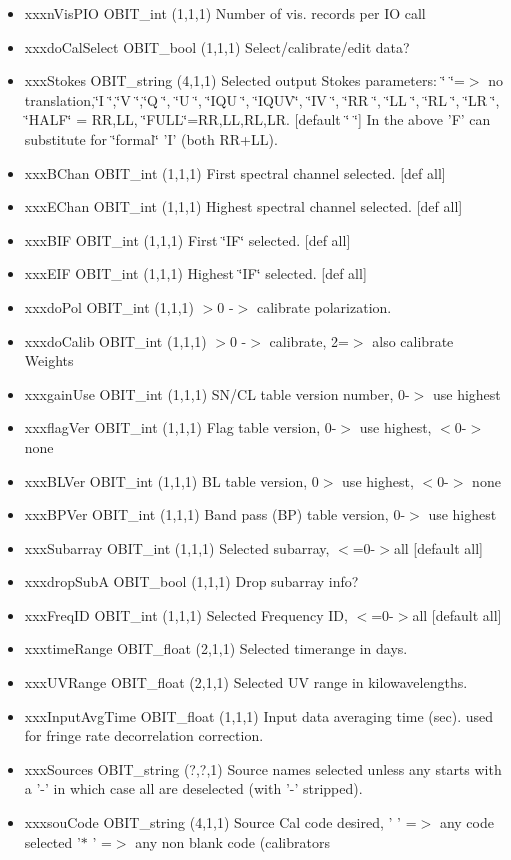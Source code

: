 \begin{Desc}
\begin{description}
\begin{itemize}
\item xxxn\-Vis\-PIO OBIT\_\-int (1,1,1) Number of vis. records per IO call \item xxxdo\-Cal\-Select OBIT\_\-bool (1,1,1) Select/calibrate/edit data? \item xxx\-Stokes OBIT\_\-string (4,1,1) Selected output Stokes parameters: \char`\"{}    \char`\"{}=$>$ no translation,\char`\"{}I   \char`\"{},\char`\"{}V   \char`\"{},\char`\"{}Q   \char`\"{}, \char`\"{}U   \char`\"{}, \char`\"{}IQU \char`\"{}, \char`\"{}IQUV\char`\"{}, \char`\"{}IV  \char`\"{}, \char`\"{}RR  \char`\"{}, \char`\"{}LL  \char`\"{}, \char`\"{}RL  \char`\"{}, \char`\"{}LR  \char`\"{}, \char`\"{}HALF\char`\"{} = RR,LL, \char`\"{}FULL\char`\"{}=RR,LL,RL,LR. [default \char`\"{}    \char`\"{}] In the above 'F' can substitute for \char`\"{}formal\char`\"{} 'I' (both RR+LL). \item xxx\-BChan OBIT\_\-int (1,1,1) First spectral channel selected. [def all] \item xxx\-EChan OBIT\_\-int (1,1,1) Highest spectral channel selected. [def all] \item xxx\-BIF OBIT\_\-int (1,1,1) First \char`\"{}IF\char`\"{} selected. [def all] \item xxx\-EIF OBIT\_\-int (1,1,1) Highest \char`\"{}IF\char`\"{} selected. [def all] \item xxxdo\-Pol OBIT\_\-int (1,1,1) $>$0 -$>$ calibrate polarization. \item xxxdo\-Calib OBIT\_\-int (1,1,1) $>$0 -$>$ calibrate, 2=$>$ also calibrate Weights \item xxxgain\-Use OBIT\_\-int (1,1,1) SN/CL table version number, 0-$>$ use highest \item xxxflag\-Ver OBIT\_\-int (1,1,1) Flag table version, 0-$>$ use highest, $<$0-$>$ none \item xxx\-BLVer OBIT\_\-int (1,1,1) BL table version, 0$>$ use highest, $<$0-$>$ none \item xxx\-BPVer OBIT\_\-int (1,1,1) Band pass (BP) table version, 0-$>$ use highest \item xxx\-Subarray OBIT\_\-int (1,1,1) Selected subarray, $<$=0-$>$all [default all] \item xxxdrop\-Sub\-A OBIT\_\-bool (1,1,1) Drop subarray info? \item xxx\-Freq\-ID OBIT\_\-int (1,1,1) Selected Frequency ID, $<$=0-$>$all [default all] \item xxxtime\-Range OBIT\_\-float (2,1,1) Selected timerange in days. \item xxx\-UVRange OBIT\_\-float (2,1,1) Selected UV range in kilowavelengths. \item xxx\-Input\-Avg\-Time OBIT\_\-float (1,1,1) Input data averaging time (sec). used for fringe rate decorrelation correction. \item xxx\-Sources OBIT\_\-string (?,?,1) Source names selected unless any starts with a '-' in which case all are deselected (with '-' stripped). \item xxxsou\-Code OBIT\_\-string (4,1,1) Source Cal code desired, ' ' =$>$ any code selected '$\ast$ ' =$>$ any non blank code (calibrators 
\end{itemize}
\end{description}
\end{Desc}
